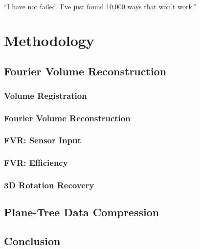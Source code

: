 \begin{savequote}[8cm]
  ``I have not failed. I've just found 10,000 ways that won't work.''
\end{savequote}
\makeatletter
\chapter{Methodology}


\section{Fourier Volume Reconstruction}
\label{FVRSectionA}


\subsection{Volume Registration} \label{Sec:VolumeRegistrationSection}


\subsection{Fourier Volume Reconstruction} \label{Sec:AFVRApproach}


\subsection{FVR: Sensor Input} 
\label{Sec:AMonoFVRApproach}


\subsection{FVR: Efficiency} \label{Sec:Efficiency}


\subsection{3D Rotation Recovery}




\section{Plane-Tree Data Compression}



\section{Conclusion}